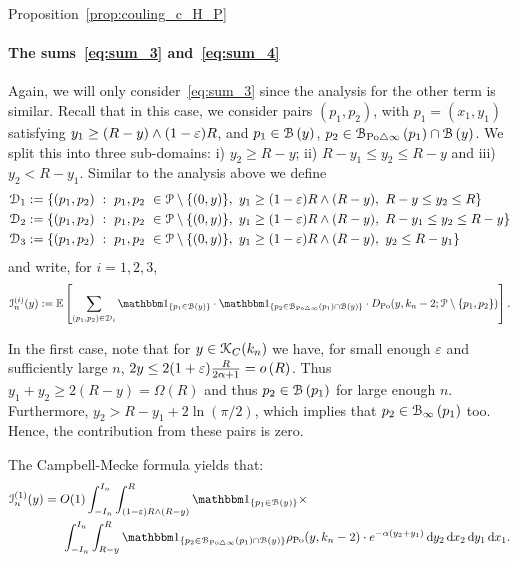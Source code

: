 \begin{proofof}{Proposition~\ref{prop:couling_c_H_P}}
\paragraph{The sums~\eqref{eq:sum_3} and~\eqref{eq:sum_4}}
Again, we will only consider~\eqref{eq:sum_3} since the analysis for the other term is similar. Recall that in this case, we consider pairs $(p_1,p_2)$, with $p_1 = (x_1,y_1)$ satisfying 
$y_1 \geq (R - y) \wedge (1-\varepsilon)R$, and $p_1 \in {\mathcal B}\left(y\right)$, $p_2 \in {\mathcal B}_{{\mathrm{Po}} \bigtriangleup \infty}\left(p_1\right) \cap {\mathcal B}\left(y\right)$. 
We split this into three sub-domains:  i) $y_2 \geq R - y$; ii) $R -y_1 \leq y_2 \leq R -y$ and iii) $y_2 < R - y_1$. Similar to the analysis above we define
\begin{align*}
	\mathcal{D}_{1} &:= \{(p_1, p_2) \ : \  p_1,p_2 \ \in {\mathcal P} \setminus \{(0,y) \}, \ y_1 \geq (1-\varepsilon) R \wedge (R-y), 
		\ R -y \leq y_2 \leq R \}\\
	\mathcal{D}_{2} &:= \{(p_1, p_2) \ : \  p_1,p_2 \ \in {\mathcal P} \setminus \{(0,y) \}, \ y_1 \geq (1-\varepsilon) R \wedge (R-y), 
		\ R -y_1 \leq y_2 \leq R - y \}\\
	\mathcal{D}_{3} &:= \{(p_1, p_2) \ : \  p_1,p_2 \ \in {\mathcal P} \setminus \{(0,y) \}, \ y_1 \geq (1-\varepsilon) R \wedge (R-y), 
		\ y_2 \leq R - y_1 \}
\end{align*}
and write, for $i = 1,2,3$,
\[
	\mathcal{I}_n^{(i)}(y) := \Exp { \sum_{(p_1,p_2)  \in \dom{i}} 
	\ind{p_1 \in \BallHyp{y}} \cdot \ind{p_2 \in \BallSym{p_1} \cap \BallHyp{y}}
	\cdot D_{\Po} (y,k_n-2;\Pcal \setminus \{ p_1, p_2\})}.
\]


In the first case, note that for $y \in {\mathcal K}_{C}(k_n)$ we have, for small enough $\varepsilon$ and sufficiently large $n$, $2y \le 2(1+\varepsilon)
\frac{R}{2\alpha +1} = o\left(R\right)$. Thus $y_1 + y_2 \geq 2(R - y) = \Omega(R)$ and thus $p_2 \in {\mathcal B}\left(p_1\right)$ for large enough $n$. Furthermore, 
$y_2 > R - y_1 + 2\ln (\pi/2)$, which implies that $p_2 \in {\mathcal B}_{\infty}\left(p_1\right)$ too. 
Hence, the contribution from these pairs is zero.   

The Campbell-Mecke formula yields that: 
\begin{equation*}
\begin{split} 
\mathcal{I}_n^{(1)}(y) 
&=O(1) \int_{-I_n}^{I_n} \int_{(1-\eps) R \wedge (R-y)}^{R} \ind{p_1 \in \BallHyp{y}} \times\\
& \hspace{15pt}\int_{-I_n}^{I_n} \int_{R - y}^{R} 
\ind{p_2 \in \BallSym{p_1} \cap \BallHyp{y}}
  \rho_{\Po}(y,k_n-2) \cdot
e^{-\alpha( y_2 + y_1)} \dd y_2 \dd x_2 \dd y_1 \dd x_1.
\end{split}
\end{equation*}


\end{proofof}
